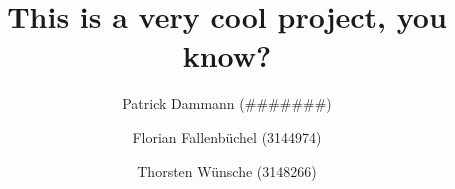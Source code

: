 \documentclass[]{scrreprt}
\title{This is a very cool project, you know?}
\author{Patrick Dammann (\#\#\#\#\#\#\#) \and Florian Fallenbüchel (3144974) \and Thorsten Wünsche (3148266)}
\begin{document}
\maketitle

\begin{abstract}
\end{abstract}

\tableofcontents










\listoffigures

\listoftables
\end{document}
